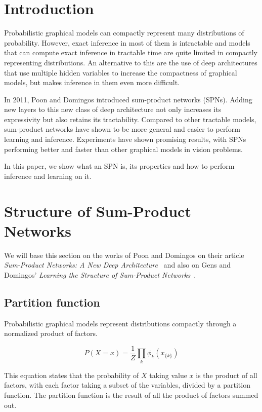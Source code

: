 \documentclass[a4paper,10pt]{article}
\theoremstyle{plain}
\begin{document}
\section{Introduction}

Probabilistic graphical models can compactly represent many distributions of probability. However,
exact inference in most of them is intractable and models that can compute exact inference in
tractable time are quite limited in compactly representing distributions. An alternative to this
are the use of deep architectures that use multiple hidden variables to increase the compactness
of graphical models, but makes inference in them even more difficult.

In 2011, Poon and Domingos introduced sum-product networks (SPNs). Adding new layers to this new
class of deep architecture not only increases its expressivity but also retains its tractability.
Compared to other tractable models, sum-product networks have shown to be more general
\cite{poon-domingos} and easier to perform learning and inference. Experiments have shown promising
results, with SPNs performing better and faster than other graphical models in vision problems.

In this paper, we show what an SPN is, its properties and how to perform inference and learning on
it.

\section{Structure of Sum-Product Networks}

We will base this section on the works of Poon and Domingos on their article \textit{Sum-Product
Networks: A New Deep Architecture}~\cite{poon-domingos} and also on Gens and Domingos'
\textit{Learning the Structure of Sum-Product Networks}~\cite{gens-domingos}.

\subsection{Partition function}

Probabilistic graphical models represent distributions compactly through a normalized product of
factors.

\begin{equation*}
  P(X=x) = \frac{1}{Z}\prod_k \phi_k (x_{\{k\}})
\end{equation*}

This equation states that the probability of $X$ taking value $x$ is the product of all factors,
with each factor taking a subset of the variables, divided by a partition function. The partition
function is the result of all the product of factors summed out.
\end{document}
